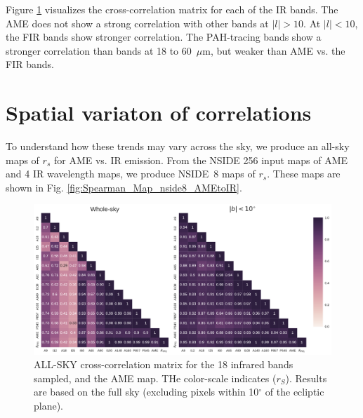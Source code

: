 {     Figure \ref{fig:AME_IR_crosscorr_allbandsg} visualizes the cross-correlation matrix for each of the IR bands. The AME does not show a strong correlation with other bands at $|l|>10$. At $|l|<10$, the FIR bands show stronger correlation. The PAH-tracing bands show a stronger correlation than bands at 18 to 60~$\mu$m, but weaker than AME vs. the FIR bands.

  \section{Spatial variaton of correlations}
    To understand how these trends may vary across the sky, we produce an all-sky maps of $r_{s}$ for AME vs. IR emission. From the NSIDE 256 input maps of AME and 4 IR wavelength maps, we produce NSIDE~8 maps of $r_{s}$. These maps are shown in Fig. \hyperref[fig:Spearman_Map_nside8_AMEtoIR]{\ref*{fig:Spearman_Map_nside8_AMEtoIR}}.

      \begin{figure}

        \includegraphics[width=\textwidth]{../Plots/all_bands_corr_matrix_wAME_spearman.pdf}
        \centering
        \caption{ALL-SKY cross-correlation matrix for the 18 infrared bands sampled, and the AME map. THe color-scale indicates ($r_{S}$). Results are based on the full sky (excluding pixels within 10$^{\circ}$ of the ecliptic plane).}
        \label{fig:AME_IR_crosscorr_allbandsg}
      \end{figure}

      \begin{figure}


\end{figure}}
